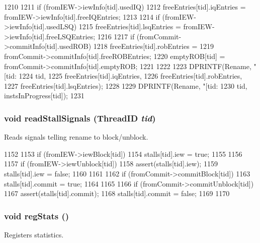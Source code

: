 \begin{DoxyCode}
1210 {
1211     if (fromIEW->iewInfo[tid].usedIQ)
1212         freeEntries[tid].iqEntries = fromIEW->iewInfo[tid].freeIQEntries;
1213 
1214     if (fromIEW->iewInfo[tid].usedLSQ)
1215         freeEntries[tid].lsqEntries = fromIEW->iewInfo[tid].freeLSQEntries;
1216 
1217     if (fromCommit->commitInfo[tid].usedROB) {
1218         freeEntries[tid].robEntries =
1219             fromCommit->commitInfo[tid].freeROBEntries;
1220         emptyROB[tid] = fromCommit->commitInfo[tid].emptyROB;
1221     }
1222 
1223     DPRINTF(Rename, "[tid:%
1224             tid,
1225             freeEntries[tid].iqEntries,
1226             freeEntries[tid].robEntries,
1227             freeEntries[tid].lsqEntries);
1228 
1229     DPRINTF(Rename, "[tid:%
1230             tid, instsInProgress[tid]);
1231 }
\end{DoxyCode}
\hypertarget{classDefaultRename_ad65c9f053a6038ac8c34c34bfe9a88c3}{
\subsubsection[{readStallSignals}]{\setlength{\rightskip}{0pt plus 5cm}void readStallSignals ({\bf ThreadID} {\em tid})}}
\label{classDefaultRename_ad65c9f053a6038ac8c34c34bfe9a88c3}
Reads signals telling rename to block/unblock. 


\begin{DoxyCode}
1152 {
1153     if (fromIEW->iewBlock[tid]) {
1154         stalls[tid].iew = true;
1155     }
1156 
1157     if (fromIEW->iewUnblock[tid]) {
1158         assert(stalls[tid].iew);
1159         stalls[tid].iew = false;
1160     }
1161 
1162     if (fromCommit->commitBlock[tid]) {
1163         stalls[tid].commit = true;
1164     }
1165 
1166     if (fromCommit->commitUnblock[tid]) {
1167         assert(stalls[tid].commit);
1168         stalls[tid].commit = false;
1169     }
1170 }
\end{DoxyCode}
\hypertarget{classDefaultRename_a4dc637449366fcdfc4e764cdf12d9b11}{
\subsubsection[{regStats}]{\setlength{\rightskip}{0pt plus 5cm}void regStats ()}}
\label{classDefaultRename_a4dc637449366fcdfc4e764cdf12d9b11}
Registers statistics. 


